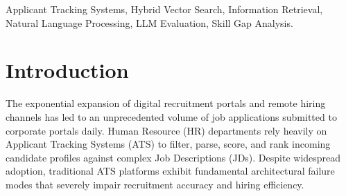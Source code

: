 \documentclass[conference]{IEEEtran}
\begin{document}
\maketitle

\begin{abstract}
Automated candidate screening in contemporary Applicant Tracking Systems (ATS) requires balancing high-dimensional semantic job comprehension with granular technical skill verification, layout parsing compatibility, and deterministic rule evaluation. Existing candidate ranking methodologies rely either on isolated dense vector embeddings—which frequently overlook hard prerequisite constraints—or rigid keyword matching engines, which fail to capture contextual domain semantics. This paper presents \textbf{PrepGenius}, an intelligent ATS framework integrating multi-stage dense vector retrieval via PostgreSQL \texttt{pgvector}, skill-vector re-ranking, LLM-driven multi-criteria evaluation, and an algorithmic ATS formatting audit engine. PrepGenius introduces a fault-tolerant multi-candidate segmentation pipeline for bulk resume ingestion alongside a dual-layer LLM/rule-based fallback parser. We evaluate the platform across standard Information Retrieval (IR) metrics including Precision, Recall, F1-Score, Mean Average Precision (MAP), and Normalized Discounted Cumulative Gain (NDCG). Empirical results demonstrate that the hybrid vector-structural architecture improves top-$K$ candidate retrieval precision by 18.4\% over pure embedding baselines while eliminating false-positive candidate classifications.
\end{abstract}

\begin{IEEEkeywords}
Applicant Tracking Systems, Hybrid Vector Search, Information Retrieval, Natural Language Processing, LLM Evaluation, Skill Gap Analysis.
\end{IEEEkeywords}

\section{Introduction}
The exponential expansion of digital recruitment portals and remote hiring channels has led to an unprecedented volume of job applications submitted to corporate portals daily. Human Resource (HR) departments rely heavily on Applicant Tracking Systems (ATS) to filter, parse, score, and rank incoming candidate profiles against complex Job Descriptions (JDs). Despite widespread adoption, traditional ATS platforms exhibit fundamental architectural failure modes that severely impair recruitment accuracy and hiring efficiency.
\end{document}
